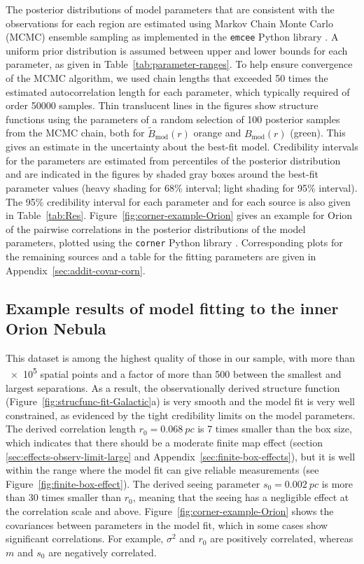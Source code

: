 \documentclass[fleqn,usenatbib, useAMS, a4paper]{mnras}
\newcommand\model{\ensuremath{_{\mathrm{mod}}}}
\begin{document}
The posterior distributions of model parameters
that are consistent with the observations for each region are estimated
using Markov Chain Monte Carlo (MCMC) ensemble sampling \citep{2010CAMCS...5...65G}
as implemented in the \texttt{emcee} Python library \citep{2013PASP..125..306F}.
A uniform prior distribution is assumed between upper and lower bounds
for each parameter, as given in Table~\ref{tab:parameter-ranges}.
To help ensure convergence of the MCMC algorithm,
we used chain lengths that exceeded \num{50} times the
estimated autocorrelation length for each parameter,
which typically required of order \num{50000} samples.
Thin translucent lines in the figures show structure functions using the parameters of
a random selection of \num{100} posterior samples from the MCMC chain,
both for \(\tilde{B}\model(r)\) orange and \(B\model(r)\) (green).
This gives an estimate in the uncertainty about the best-fit model.
Credibility intervals for the parameters are estimated from percentiles
of the posterior distribution and are indicated in the figures by shaded gray boxes
around the best-fit parameter values
(heavy shading for 68\% interval; light shading for 95\% interval).
The 95\% credibility interval for each parameter and for each source
is also given in Table~\ref{tab:Res}.
Figure~\ref{fig:corner-example-Orion} gives an example for Orion of
the pairwise correlations in the posterior distributions of the model parameters,
plotted using the \texttt{corner} Python library \citep{2017ascl.soft02002F}.
Corresponding plots for the remaining sources and a table for the fitting parameters are given in Appendix~\ref{sec:addit-covar-corn}.


\subsection{Example results of model fitting to the inner Orion Nebula}
\label{sec:example-results-orion}

This dataset is among the highest quality of those in our sample,
with more than \num{e5} spatial points and a factor of more than \num{500}
between the smallest and largest separations.
As a result, the observationally derived structure function (Figure~\ref{fig:strucfunc-fit-Galactic}a)
is very smooth and the model fit is very well constrained,
as evidenced by the tight credibility limits on the model parameters.
The derived correlation length \(r_0 = \SI{0.068}{pc}\) is \num{7} times smaller
than the box size, which indicates that there should be a moderate finite map effect
(section \ref{sec:effects-observ-limit-large} and Appendix~\ref{sec:finite-box-effects}),
but it is well within the range where the model fit can give reliable measurements
(see Figure~\ref{fig:finite-box-effect}).
The derived seeing parameter \(s_0 = \SI{0.002}{pc}\) is more than \num{30} times smaller
than \(r_0\), meaning that the seeing has a negligible effect at the correlation scale and above.
Figure~\ref{fig:corner-example-Orion}  shows  the covariances  between
parameters  in the  model fit,
which in some cases show significant correlations.
For example, \(\sigma^2\) and \(r_0\) are positively correlated,
whereas \(m\) and \(s_0\) are negatively correlated. 
\end{document}
